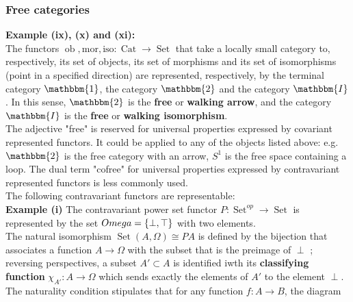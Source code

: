 \documentclass[a4paper]{article}
\DeclareMathOperator{\ob}{ob}
\DeclareMathOperator{\Set}{Set}
\DeclareMathOperator{\Cat}{Cat}
\begin{document}
\subsubsection*{Free categories}
\textbf{Example (ix), (x) and (xi):}\\
The functors $\ob, \text{mor}, \text{iso}  \colon \Cat \to \Set $ that take
a locally small category to, respectively, its set of objects,
its set of morphisms and its set of isomorphisms (point in a specified
direction) are represented, respectively, by the terminal category
$\mathbbm{1} $, the category $\mathbbm{2}$ and
the category $\mathbbm{I}$. In this sense, $\mathbbm{2}$ is the \textbf{free}
or \textbf{walking arrow}, and the category $\mathbbm{I}$ is the \textbf{free}
or \textbf{walking isomorphism}.\\
\linebreak
The adjective "free" is reserved for universal properties expressed by
covariant represented functors. It could be applied to any of the objects
listed above: e.g. $\mathbbm{2}$ is the free category with an arrow,
$S^{1}$ is the free space containing a loop. The dual term
"cofree" for universal properties expressed by contravariant represented
functors is less commonly used.\\
\linebreak
The following contravariant functors are representable:\\
\linebreak
\textbf{Example (i)} The contravariant power set functor
$P  \colon \Set^{op} \to \Set$ is represented by the set
$\\Omega = \left\{ \perp, \top \right\} $ with two elements.\\
The natural isomorphism $\Set (A, \Omega) \cong PA$ is defined by
the bijection that associates a function $A \to \Omega$ with the subset that is
the preimage of $\perp$ ; reversing perspectives, a subset $A' \subset A$ is
identified iwth its \textbf{classifying function}
$\chi_{A'}  \colon A \to \Omega$ which sends exactly the elements
of $A'$ to the element $\perp$. The naturality condition
stipulates that for any function $f  \colon A \to B$, the diagram
\end{document}
